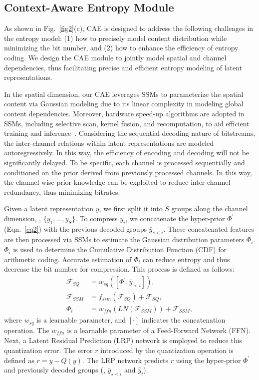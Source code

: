 \subsection{Context-Aware Entropy Module}
\label{sec CAE}

As shown in Fig.~\ref{fig2}(c), CAE is designed to address the following challenges in the entropy model:
(1) how to precisely model content distribution while minimizing the bit number, and
(2) how to enhance the efficiency of entropy coding.
We design the CAE module to jointly model spatial and channel dependencies, thus facilitating precise and efficient entropy modeling of latent representations.


In the spatial dimension, our CAE leverages SSMs to parameterize the spatial content via Gaussian modeling due to its linear complexity in modeling global content dependencies.
Moreover, hardware speed-up algorithms are adopted in SSMs, including selective scan, kernel fusion, and recomputation, to aid efficient training and inference~\cite{gu2023mamba, zhu2024vision, liu2024vmamba, li2024videomamba}. 
Considering the sequential decoding nature of bitstreams, the inter-channel relations within latent representations are modeled autoregressively. 
In this way, the efficiency of encoding and decoding will not be significantly delayed.
To be specific, each channel is processed sequentially and conditioned on the prior derived from previously processed channels.
In this way, the channel-wise prior knowledge can be exploited to reduce inter-channel redundancy, thus minimizing bitrates.


Given a latent representation $y$, we first split it into $S$ groups along the channel dimension, \ie, $\{y_1, ... , y_S\}$.
To compress $y_{i}$, we concatenate the hyper-prior $\Phi^{'}$ (Eqn.~\eqref{eq2}) with the previous decoded groups $\bar{y}_{s<i}$.
These concatenated features are then processed via SSMs to estimate the Gaussian distribution parameters $\Phi_{i}$.
$\Phi_{i}$ is used to determine the Cumulative Distribution Function (CDF) for arithmetic coding.
Accurate estimation of $\Phi_{i}$ can reduce entropy and thus decrease the bit number for compression.
This process is defined as follows:
\begin{equation}
\begin{aligned}
\mathcal{F}_\textit{SQ} &= w_{sq}([\Phi^{'}, \bar{y}_{<i}]), \\
\mathcal{F}_\textit{SSM} &= f_\textit{ssm}(\mathcal{F}_\textit{SQ}) + \mathcal{F}_\textit{SQ}, \\
\Phi_{i} &= w_\textit{ffn}(\textit{LN}(\mathcal{F}_\textit{SSM})) + \mathcal{F}_\textit{SSM}, 
\end{aligned}
\label{eq9}
\end{equation}
where $w_{sq}$ is a learnable parameter,
and $\left[\cdot\right]$ indicates the concatenation operation.
The $w_\textit{ffn}$ is a learnable parameter of a Feed-Forward Network (FFN).
Next, a Latent Residual Prediction (LRP) network is employed to reduce this quantization error.
The error $r$ introduced by the quantization operation is defined as $r = y - Q(y)$.
The LRP network predicts $r$ using the hyper-prior $\Phi^{'}$ and previously decoded groups (\ie, $\bar{y}_{s<i}$ and $\hat{y}_{i}$).